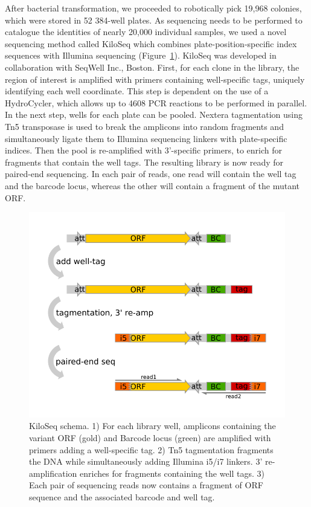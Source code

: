 After bacterial transformation, we proceeded to robotically pick 19,968 colonies, which were stored in 52 384-well plates. As sequencing needs to be performed to catalogue the identities of nearly 20,000 individual samples, we used a novel sequencing method called KiloSeq which combines plate-position-specific index sequences with Illumina sequencing (Figure~\ref{fig:kiloseq_schema}).
KiloSeq was developed in collaboration with SeqWell Inc., Boston. First, for each clone in the library, the region of interest is amplified with primers containing well-specific tags, uniquely identifying each well coordinate. This step is dependent on the use of a HydroCycler, which allows up to 4608 PCR reactions to be performed in parallel. In the next step, wells for each plate can be pooled. Nextera tagmentation using Tn5 transposase is used to break the amplicons into random fragments and simultaneously ligate them to Illumina sequencing linkers with plate-specific indices. Then the pool is re-amplified with 3'-specific primers, to enrich for fragments that contain the well tags. The resulting library is now ready for paired-end sequencing. In each pair of reads, one read will contain the well tag and the barcode locus, whereas the other will contain a fragment of the mutant ORF.

\begin{figure}[h!]
	\centering
	\includegraphics[width=.5\textwidth]{img/kiloseq_schema_new.pdf}
	\caption{KiloSeq schema. 1) For each library well, amplicons containing the variant ORF (gold) and Barcode locus (green) are amplified with primers adding a well-specific tag. 2) Tn5 tagmentation fragments the DNA while simultaneously adding Illumina i5/i7 linkers. 3' re-amplification enriches for fragments containing the well tags. 3) Each pair of sequencing reads now contains a fragment of ORF sequence and the associated barcode and well tag.}
	\label{fig:kiloseq_schema}
\end{figure}

